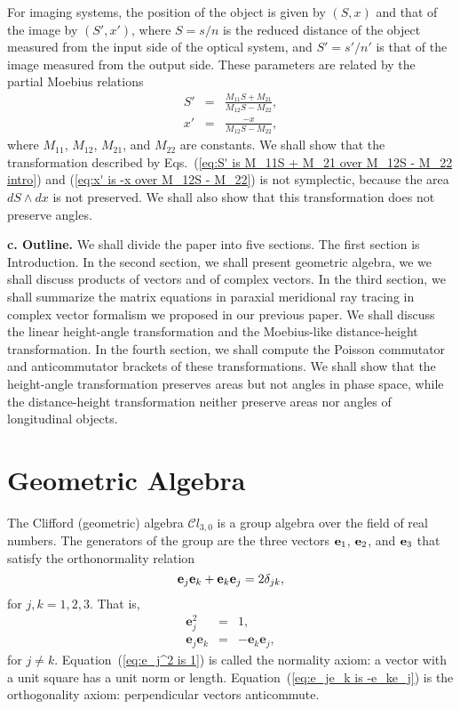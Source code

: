 \documentclass[11pt,twocolumn]{article}
\begin{document}
For imaging systems, the position of the object is given by $(S, x)$ and that of the image by $(S',x')$, where $S=s/n$ is the reduced distance of the object measured from the input side of the optical system, and $S'=s'/n'$ is that of the image measured from the output side.  These parameters are related by the partial Moebius relations\cite{SugonMcNamara_2008_arXiv0812.0664v1_p8}
\begin{eqnarray}
\label{eq:S' is M_11S + M_21 over M_12S - M_22 intro}
S'&=&\frac{M_{11}S+M_{21}}{M_{12}S-M_{22}},\\
\label{eq:x' is -x over M_12S - M_22}
x'&=&\frac{-x}{M_{12}S-M_{22}},
\end{eqnarray}
where $M_{11}$, $M_{12}$, $M_{21}$, and $M_{22}$ are constants.  We shall show that the transformation described by Eqs.~(\ref{eq:S' is M_11S + M_21 over M_12S - M_22 intro}) and (\ref{eq:x' is -x over M_12S - M_22}) is not symplectic, because the area $dS\wedge dx$ is not preserved.  We shall also show that this transformation does not preserve angles.

\textbf{c.  Outline.}  We shall divide the paper into five sections.  The first section is Introduction.  In the second section, we shall present geometric algebra, we we shall discuss products of vectors and of complex vectors.  In the third section, we shall summarize the matrix equations in paraxial meridional ray tracing in complex vector formalism we proposed in our previous paper\cite{SugonMcNamara_2008_arXiv0812.0664v1_p8}.  We shall discuss the linear height-angle transformation and the Moebius-like distance-height transformation.  In the fourth section, we shall compute the Poisson commutator and anticommutator brackets of these transformations.  We shall show that the height-angle transformation preserves areas but not angles in phase space, while the distance-height transformation neither preserve areas nor angles of longitudinal objects.

\section{Geometric Algebra}

The Clifford (geometric) algebra $\mathcal Cl_{3,0}$ is a group\cite{SugonMcNamara_2008_arXiv0809.0351v1_p2-3} algebra over the field of real numbers.  The generators of the group are the three vectors ${\bf e}_1$, ${\bf e}_2$, and ${\bf e}_3$ that satisfy the orthonormality relation\cite{BaylisHuschiltWei_1992_ajpv60i9pp788-797_p789}
\begin{equation}
\label{eq:e_je_k + e_ke_j is 2 delta_jk}
{\bf e}_j{\bf e}_k + {\bf e}_k{\bf e}_j = 2\delta_{jk},
\end{equation}
for $j,k=1,2,3$.  That is, 
\begin{eqnarray}
\label{eq:e_j^2 is 1}
\mathbf e_j^2 &=& 1,\\ 
\label{eq:e_je_k is -e_ke_j}
\mathbf e_j\mathbf e_k &=& -\mathbf e_k\mathbf e_j,  
\end{eqnarray}
for $j\neq k$.  Equation~(\ref{eq:e_j^2 is 1}) is called the normality axiom: a vector with a unit square has a unit norm or length.  Equation~(\ref{eq:e_je_k is -e_ke_j}) is the orthogonality axiom: perpendicular vectors anticommute.
 
\end{document}
